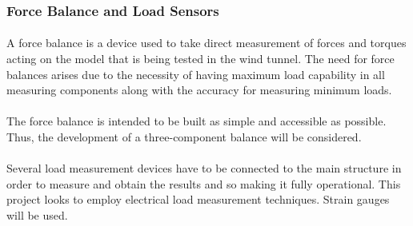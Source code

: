 \subsubsection{Force Balance and Load Sensors}
\paragraph{}A force balance is a device used to take direct measurement of forces and torques acting on the model that is being tested in the wind tunnel. The need for force balances arises due to the necessity of having maximum load capability in all measuring components along with the accuracy for measuring minimum loads. 
\cite{fernandes_design_nodate}
\paragraph{}The force balance is intended to be built as simple and accessible as possible. Thus, the development of a three-component balance will be considered.

\paragraph{}Several load measurement devices have to be connected to the main structure in order to measure and obtain the results and so making it fully operational. This project looks to employ electrical load measurement techniques. Strain gauges will be used.


